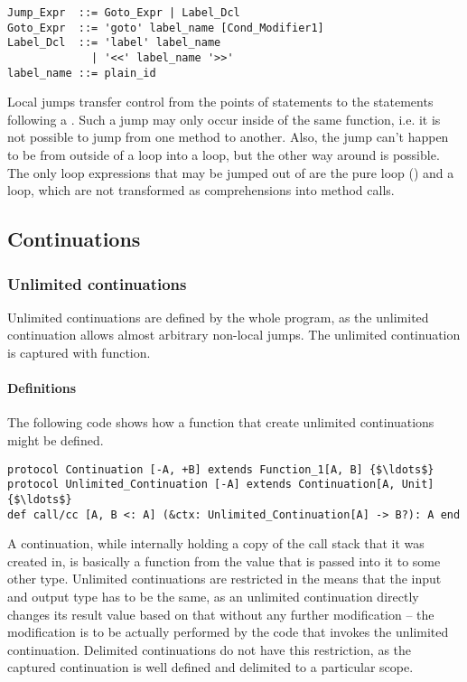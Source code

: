 \syntax\begin{lstlisting}
Jump_Expr  ::= Goto_Expr | Label_Dcl
Goto_Expr  ::= 'goto' label_name [Cond_Modifier1]
Label_Dcl  ::= 'label' label_name 
             | '<<' label_name '>>'
label_name ::= plain_id
\end{lstlisting}

Local jumps transfer control from the points of  statements to the statements following a . Such a jump may only occur inside of the same function, i.e. it is not possible to jump from one method to another. Also, the jump can't happen to be from outside of a loop into a loop, but the other way around is possible. The only loop expressions that may be jumped out of are the pure loop () and a  loop, which are not transformed as comprehensions into method calls. 






\subsection{Continuations}
\label{sec:continuations}






\subsubsection{Unlimited continuations}

Unlimited continuations are defined by the whole program, as the unlimited continuation allows almost arbitrary non-local jumps. The unlimited continuation is captured with  function. 

\paragraph{Definitions}
The following code shows how a function that create unlimited continuations might be defined. 
\begin{lstlisting}
protocol Continuation [-A, +B] extends Function_1[A, B] {$\ldots$}
protocol Unlimited_Continuation [-A] extends Continuation[A, Unit] {$\ldots$}
def call/cc [A, B <: A] (&ctx: Unlimited_Continuation[A] -> B?): A end
\end{lstlisting}

A continuation, while internally holding a copy of the call stack that it was created in, is basically a function from the value that is passed into it to some other type. Unlimited continuations are restricted in the means that the input and output type has to be the same, as an unlimited continuation directly changes its result value based on that without any further modification -- the modification is to be actually performed by the code that invokes the unlimited continuation. Delimited continuations do not have this restriction, as the captured continuation is well defined and delimited to a particular scope. 


